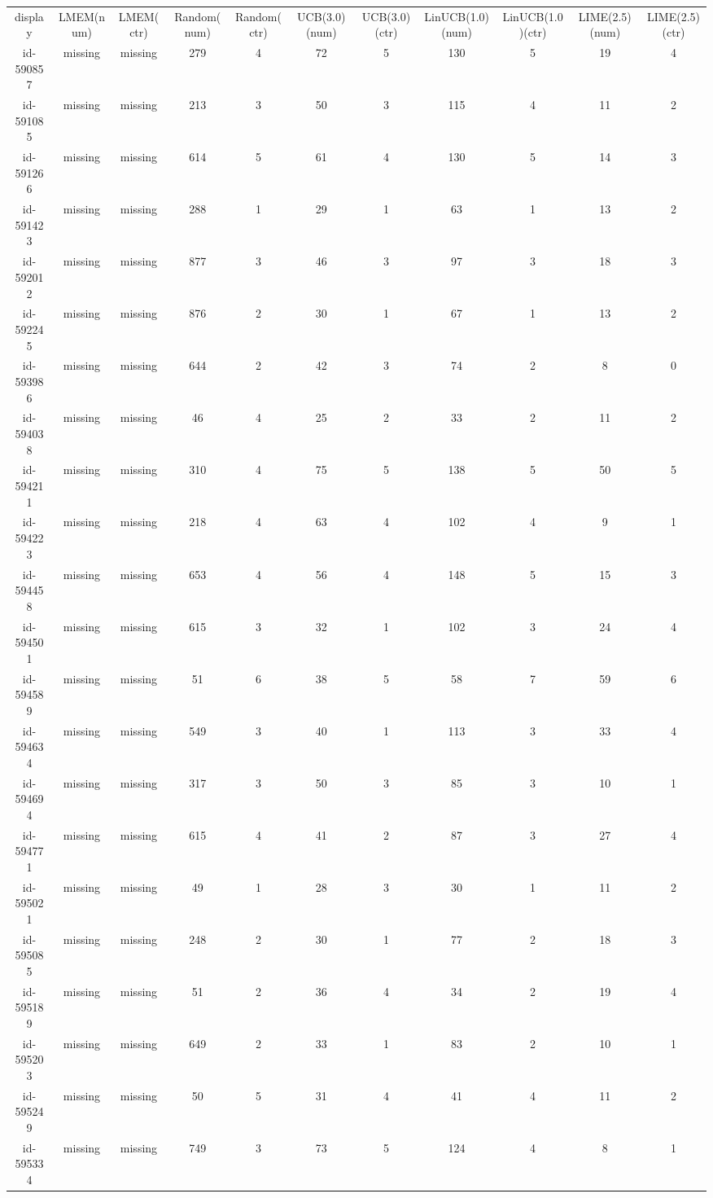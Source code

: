 \begin{tabular}{ccccccccccc}
display & LMEM(num) & LMEM(ctr) & Random(num) & Random(ctr) & UCB(3.0)(num) & UCB(3.0)(ctr) & LinUCB(1.0)(num) & LinUCB(1.0)(ctr) & LIME(2.5)(num) & LIME(2.5)(ctr)\\
id-590857 & missing & missing & 279 & 4 & 72 & 5 & 130 & 5 & 19 & 4\\
id-591085 & missing & missing & 213 & 3 & 50 & 3 & 115 & 4 & 11 & 2\\
id-591266 & missing & missing & 614 & 5 & 61 & 4 & 130 & 5 & 14 & 3\\
id-591423 & missing & missing & 288 & 1 & 29 & 1 & 63 & 1 & 13 & 2\\
id-592012 & missing & missing & 877 & 3 & 46 & 3 & 97 & 3 & 18 & 3\\
id-592245 & missing & missing & 876 & 2 & 30 & 1 & 67 & 1 & 13 & 2\\
id-593986 & missing & missing & 644 & 2 & 42 & 3 & 74 & 2 & 8 & 0\\
id-594038 & missing & missing & 46 & 4 & 25 & 2 & 33 & 2 & 11 & 2\\
id-594211 & missing & missing & 310 & 4 & 75 & 5 & 138 & 5 & 50 & 5\\
id-594223 & missing & missing & 218 & 4 & 63 & 4 & 102 & 4 & 9 & 1\\
id-594458 & missing & missing & 653 & 4 & 56 & 4 & 148 & 5 & 15 & 3\\
id-594501 & missing & missing & 615 & 3 & 32 & 1 & 102 & 3 & 24 & 4\\
id-594589 & missing & missing & 51 & 6 & 38 & 5 & 58 & 7 & 59 & 6\\
id-594634 & missing & missing & 549 & 3 & 40 & 1 & 113 & 3 & 33 & 4\\
id-594694 & missing & missing & 317 & 3 & 50 & 3 & 85 & 3 & 10 & 1\\
id-594771 & missing & missing & 615 & 4 & 41 & 2 & 87 & 3 & 27 & 4\\
id-595021 & missing & missing & 49 & 1 & 28 & 3 & 30 & 1 & 11 & 2\\
id-595085 & missing & missing & 248 & 2 & 30 & 1 & 77 & 2 & 18 & 3\\
id-595189 & missing & missing & 51 & 2 & 36 & 4 & 34 & 2 & 19 & 4\\
id-595203 & missing & missing & 649 & 2 & 33 & 1 & 83 & 2 & 10 & 1\\
id-595249 & missing & missing & 50 & 5 & 31 & 4 & 41 & 4 & 11 & 2\\
id-595334 & missing & missing & 749 & 3 & 73 & 5 & 124 & 4 & 8 & 1\\

\end{tabular}
